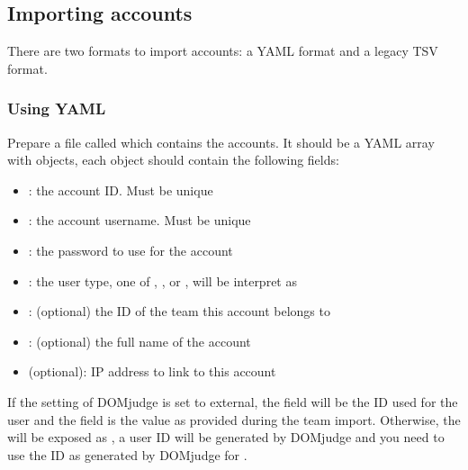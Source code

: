 \documentclass[a4paper,10pt,english,openany]{sphinxmanual}
\begin{document}
\subsection{Importing accounts}
\label{\detokenize{import:importing-accounts}}
\sphinxAtStartPar
There are two formats to import accounts: a YAML format and a legacy TSV format.


\subsubsection{Using YAML}
\label{\detokenize{import:using-yaml}}
\sphinxAtStartPar
Prepare a file called  which contains the accounts.
It should be a YAML array with objects, each object should contain the following
fields:
\begin{itemize}
\item {} 
\sphinxAtStartPar
{}: the account ID. Must be unique

\item {} 
\sphinxAtStartPar
{}: the account username. Must be unique

\item {} 
\sphinxAtStartPar
{}: the password to use for the account

\item {} 
\sphinxAtStartPar
{}: the user type, one of , ,  or ,  will be interpret as 

\item {} 
\sphinxAtStartPar
{}: (optional) the ID of the team this account belongs to

\item {} 
\sphinxAtStartPar
{}: (optional) the full name of the account

\item {} 
\sphinxAtStartPar
{} (optional): IP address to link to this account

\end{itemize}

\sphinxAtStartPar
If the  setting of DOMjudge is set to external, the  field will be the ID
used for the user and the  field is the value as provided during the team import.
Otherwise, the  will be exposed as , a user ID will be generated by DOMjudge
and you need to use the ID as generated by DOMjudge for .
\end{document}
